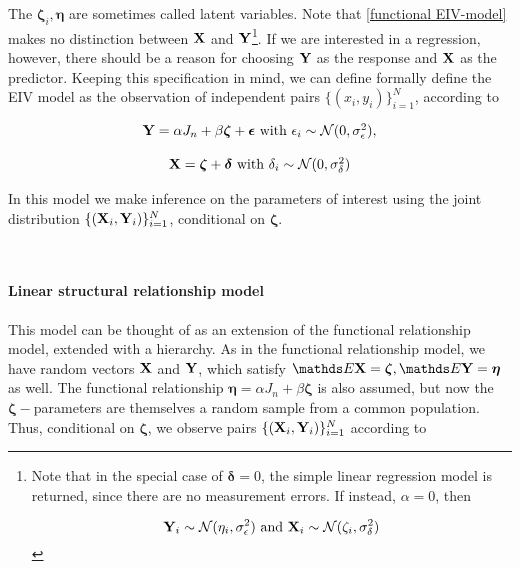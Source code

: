 \documentclass{homework}
\begin{document}
The $ \bm{\zeta}_i, \bm{\eta}$ are sometimes called latent variables. Note that \eqref{functional EIV-model} makes no distinction between ${\bf X}$ and ${\bf Y}$\footnote{Note that in the special case of $\bm{\delta} = 0$, the simple linear regression model is returned, since there are no measurement errors. If instead, $\alpha = 0$, then 

\begin{equation*}
     {\bf Y}_i \sim \mathcal{N}(\eta_i, \sigma^2_\epsilon) \textnormal{ and } {\bf X}_i \sim \mathcal{N}(\zeta_i, \sigma^2_\delta) 
\end{equation*}}. If we are interested in a regression, however, there should be a reason for choosing ${\bf Y}$ as the response and ${\bf X}$ as the predictor. Keeping this specification in mind, we can define formally define the EIV model as the observation of independent pairs $\{(x_i, y_i)\}_{i=1}^{N}$, according to 

\begin{equation}
    \begin{array}{c}
         {\bf Y} = \alpha J_n + \beta \bm{\zeta} + \bm{\epsilon}  \textnormal{ with } \epsilon_i \sim \mathcal{N}(0, \sigma^2_\epsilon), \\
         \\
         {\bf X} = \bm{\zeta} + \bm{\delta} \textnormal{ with } \delta_i \sim \mathcal{N}(0, \sigma^2_\delta)
    \end{array}
\end{equation}

In this model we make inference on the parameters of interest using the joint distribution $\{({\bf X}_i, {\bf Y}_i)\}_{i=1}^{N}$, conditional on $\bm{\zeta}$. 

\blank \\

\paragraph{\textbf{Linear structural relationship model}}

This model can be thought of as an extension of the functional relationship model, extended with a hierarchy. As in the functional relationship model, we have random vectors ${\bf X}$ and ${\bf Y}$, which satisfy $ \E \X = \bm{\zeta}, \E \Y = \bm{\eta}$ as well. The functional relationship $\bm{\eta} = \alpha J_n + \beta \bm{\zeta}$ is also assumed, but now the $\bm{\zeta}-$parameters are themselves a random sample from a common population. Thus, conditional on $\bm{\zeta}$, we observe pairs $\{({\bf X}_i, {\bf Y}_i)\}_{i=1}^{N}$ according to 
\end{document}
